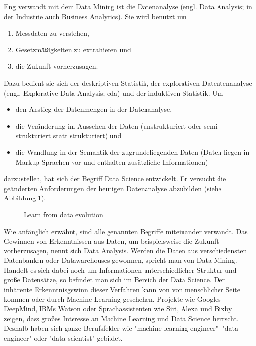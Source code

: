 Eng verwandt mit dem Data Mining ist die Datenanalyse (engl. Data Analysis; in der Industrie auch Business Analytics\citep[S.~58]{swamynathan_mastering_2017}). Sie wird benutzt um\citep[S.~2; Teil 1]{hertle_datenanalyse_2016}
\begin{enumerate}
\item Messdaten zu verstehen,
\item Gesetzmäßigkeiten zu extrahieren und
\item die Zukunft vorherzusagen.
\end{enumerate}
Dazu bedient sie sich der deskriptiven Statistik, der explorativen Datentenanalyse (engl. Explorative Data Analysis; \gls{eda}) und der induktiven Statistik.\citep[S.~17]{hertle_datenanalyse_2016}\newline
Um 
\begin{itemize}
\item den Anstieg der Datenmengen in der Datenanalyse,
\item die Veränderung im Aussehen der Daten (unstrukturiert oder semi-strukturiert statt strukturiert) und
\item die Wandlung in der Semantik der zugrundeliegenden Daten (Daten liegen in Markup-Sprachen vor und enthalten zusätzliche Informationen)
\end{itemize}
darzustellen, hat sich der Begriff Data Science entwickelt.\citep{dhar_data_2013} Er versucht die geänderten Anforderungen der heutigen Datenanalyse abzubilden (siehe Abbildung \ref{fig:dataEvolution}).

\begin{figure}[H]
\centering
{}
\caption{Learn from data evolution \citep[S.~66]{swamynathan_mastering_2017}}
\label{fig:dataEvolution}
\end{figure}
Wie anfänglich erwähnt, sind alle genannten Begriffe miteinander verwandt. Das Gewinnen von Erkenntnissen aus Daten, um beispielsweise die Zukunft vorherzusagen, nennt sich Data Analysis. Werden die Daten aus verschiedensten Datenbanken oder Datawarehouses gewonnen, spricht man von Data Mining. Handelt es sich dabei noch um Informationen unterschiedlicher Struktur und große Datensätze, so befindet man sich im Bereich der Data Science. Der inhärente Erkenntnisgewinn dieser Verfahren kann von von menschlicher Seite kommen oder durch Machine Learning geschehen.\newline
Projekte wie Googles DeepMind\citep{deepmind_deepmind_2017}, IBMs Watson\citep{ibm_ibm_2017} oder Sprachassistenten wie Siri, Alexa und Bixby zeigen, dass großes Interesse an Machine Learning und Data Science herrscht. Deshalb haben sich ganze Berufsfelder wie "machine learning engineer", "data engineer" oder "data scientist"\citep[S.~1]{ramasubramanian_machine_2017} gebildet.


